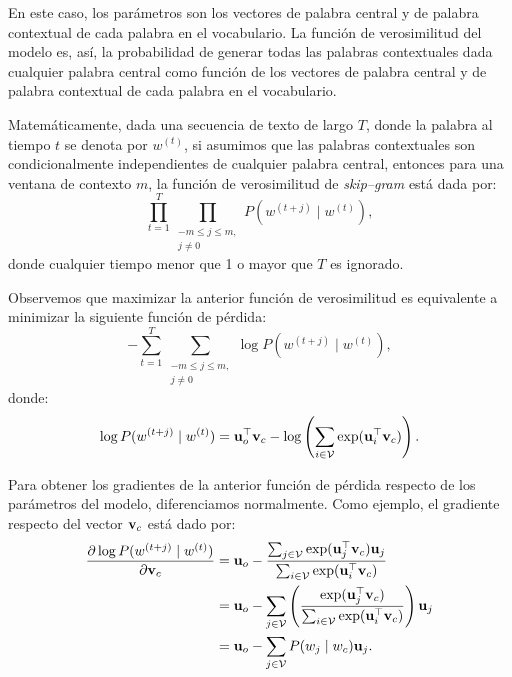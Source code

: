 \documentclass[12pt]{article}
\newcommand{\ce}{\bm{\textbf v}}
\newcommand{\co}{\bm{\textbf u}}
\begin{document}
En este caso, los parámetros son los vectores de palabra central y de palabra contextual de cada palabra en el vocabulario. La función de verosimilitud del modelo es, así, la probabilidad de generar todas las palabras contextuales dada cualquier palabra central como función de los vectores de palabra central y de palabra contextual de cada palabra en el vocabulario.

Matemáticamente, dada una secuencia de texto de largo $ T $, donde la palabra al tiempo $ t $ se denota por $ w^{(t)} $, si asumimos que las palabras contextuales son condicionalmente independientes de cualquier palabra central, entonces para una ventana de contexto $ m $, la función de verosimilitud de \textit{skip--gram} está dada por:
\begin{equation}
    \prod_{t=1}^{T} \prod_{\substack{-m \leq j \leq m, \\ j\neq 0}} P(w^{(t+j)} \mid w^{(t)}),
\end{equation}
donde cualquier tiempo menor que 1 o mayor que $ T $ es ignorado.

Observemos que maximizar la anterior función de verosimilitud es equivalente a minimizar la siguiente función de pérdida:
\begin{equation}
    -\sum_{t=1}^{T} \sum_{\substack{-m \leq j \leq m, \\ j\neq 0}} \log P(w^{(t+j)} \mid w^{(t)}), \label{eq:skip-gram loss}
\end{equation}
donde:
\begin{equation}
    \log P(w^{(t+j)} \mid w^{(t)}) = \co_o^{\top}\ce_c - \log\left(\sum_{i \in \mathcal{V}}\exp(\co_i^{\top}\ce_c) \right).
\end{equation}

Para obtener los gradientes de la anterior función de pérdida respecto de los parámetros del modelo, diferenciamos normalmente. Como ejemplo, el gradiente respecto del vector $ \ce_c $ está dado por:
\begin{align}
    \frac{\partial \log P(w^{(t+j)} \mid w^{(t)})}{\partial \ce_c} &= \co_o - \frac{\sum_{j \in \mathcal{V}}\exp(\co_j^{\top}\ce_c)\co_j}{\sum_{i \in \mathcal{V}}\exp(\co_i^{\top}\ce_c)} \\
    &= \co_o - \sum_{j \in \mathcal{V}} \left( \frac{\exp(\co_j^{\top}\ce_c)}{\sum_{i \in \mathcal{V}}\exp(\co_i^{\top}\ce_c)} \right)\co_j \\
    &= \co_o - \sum_{j \in \mathcal{V}} P(w_j \mid w_c)\co_j.
\end{align}
\end{document}
